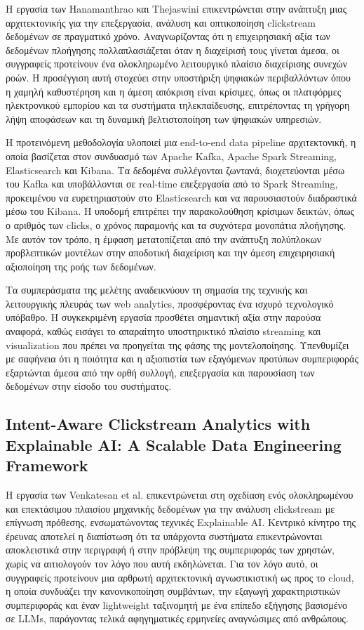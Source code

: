 \documentclass[12pt,a4paper]{article}
\begin{document}
	Η εργασία των Hanamanthrao και Thejaswini \cite{RealTimeClickstream} επικεντρώνεται στην ανάπτυξη μιας αρχιτεκτονικής για την επεξεργασία, ανάλυση και οπτικοποίηση clickstream δεδομένων σε πραγματικό χρόνο. Αναγνωρίζοντας ότι η επιχειρησιακή αξία των δεδομένων πλοήγησης πολλαπλασιάζεται όταν η διαχείρισή τους γίνεται άμεσα, οι συγγραφείς προτείνουν ένα ολοκληρωμένο λειτουργικό πλαίσιο διαχείρισης συνεχών ροών. Η προσέγγιση αυτή στοχεύει στην υποστήριξη ψηφιακών περιβαλλόντων όπου η χαμηλή καθυστέρηση και η άμεση απόκριση είναι κρίσιμες, όπως οι πλατφόρμες ηλεκτρονικού εμπορίου και τα συστήματα τηλεκπαίδευσης, επιτρέποντας τη γρήγορη λήψη αποφάσεων και τη δυναμική βελτιστοποίηση των ψηφιακών υπηρεσιών.
	
	Η προτεινόμενη μεθοδολογία υλοποιεί μια end-to-end data pipeline αρχιτεκτονική, η οποία βασίζεται στον συνδυασμό των Apache Kafka, Apache Spark Streaming, Elasticsearch και Kibana. Τα δεδομένα συλλέγονται ζωντανά, διοχετεύονται μέσω του Kafka και υποβάλλονται σε real-time επεξεργασία από το Spark Streaming, προκειμένου να ευρετηριαστούν στο Elasticsearch και να παρουσιαστούν διαδραστικά μέσω του Kibana. Η υποδομή επιτρέπει την παρακολούθηση κρίσιμων δεικτών, όπως ο αριθμός των clicks, ο χρόνος παραμονής και τα συχνότερα μονοπάτια πλοήγησης. Με αυτόν τον τρόπο, η έμφαση μετατοπίζεται από την ανάπτυξη πολύπλοκων προβλεπτικών μοντέλων στην αποδοτική διαχείριση και την άμεση επιχειρησιακή αξιοποίηση της ροής των δεδομένων.
	
	Τα συμπεράσματα της μελέτης αναδεικνύουν τη σημασία της τεχνικής και λειτουργικής πλευράς των web analytics, προσφέροντας ένα ισχυρό τεχνολογικό υπόβαθρο. Η συγκεκριμένη εργασία προσθέτει σημαντική αξία στην παρούσα αναφορά, καθώς εισάγει το απαραίτητο υποστηρικτικό πλαίσιο streaming και visualization που πρέπει να προηγείται της φάσης της μοντελοποίησης. Υπενθυμίζει με σαφήνεια ότι η ποιότητα και η αξιοπιστία των εξαγόμενων προτύπων συμπεριφοράς εξαρτώνται άμεσα από την ορθή συλλογή, επεξεργασία και παρουσίαση των δεδομένων στην είσοδο του συστήματος.
	
	\subsection{Intent-Aware Clickstream Analytics with
		Explainable AI:
		A Scalable Data Engineering Framework}
	
	Η εργασία των Venkatesan et al. \cite{Venkatesan2026} επικεντρώνεται στη σχεδίαση ενός ολοκληρωμένου και επεκτάσιμου πλαισίου μηχανικής δεδομένων για την ανάλυση clickstream με επίγνωση πρόθεσης, ενσωματώνοντας τεχνικές Explainable AI. Κεντρικό κίνητρο της έρευνας αποτελεί η διαπίστωση ότι τα υπάρχοντα συστήματα επικεντρώνονται αποκλειστικά στην περιγραφή ή στην πρόβλεψη της συμπεριφοράς των χρηστών, χωρίς να αιτιολογούν τον λόγο που αυτή εκδηλώνεται. Για τον λόγο αυτό, οι συγγραφείς προτείνουν μια αρθρωτή αρχιτεκτονική αγνωστικιστική ως προς το cloud, η οποία συνδυάζει την κανονικοποίηση συμβάντων, την εξαγωγή χαρακτηριστικών συμπεριφοράς και έναν lightweight ταξινομητή με ένα επίπεδο εξήγησης βασισμένο σε LLMs, παράγοντας τελικά αφηγηματικές ερμηνείες αναγνώσιμες από ανθρώπους.
	
\end{document}
